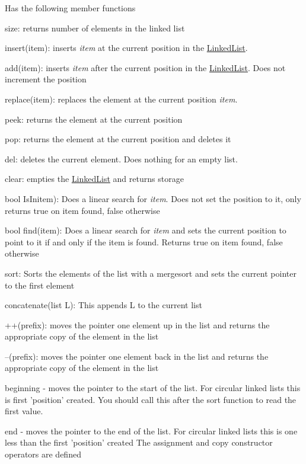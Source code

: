 Has the following member functions
\begin{DoxyItemize}
\item size\-: returns number of elements in the linked list
\item insert(item)\-: inserts {\itshape item} at the current position in the \hyperlink{class_data_structures_1_1_linked_list}{Linked\-List}.
\item add(item)\-: inserts {\itshape item} after the current position in the \hyperlink{class_data_structures_1_1_linked_list}{Linked\-List}. Does not increment the position
\item replace(item)\-: replaces the element at the current position {\itshape item}.
\item peek\-: returns the element at the current position
\item pop\-: returns the element at the current position and deletes it
\item del\-: deletes the current element. Does nothing for an empty list.
\item clear\-: empties the \hyperlink{class_data_structures_1_1_linked_list}{Linked\-List} and returns storage
\item bool Is\-Initem)\-: Does a linear search for {\itshape item}. Does not set the position to it, only returns true on item found, false otherwise
\item bool find(item)\-: Does a linear search for {\itshape item} and sets the current position to point to it if and only if the item is found. Returns true on item found, false otherwise
\item sort\-: Sorts the elements of the list with a mergesort and sets the current pointer to the first element
\item concatenate(list L)\-: This appends L to the current list
\item ++(prefix)\-: moves the pointer one element up in the list and returns the appropriate copy of the element in the list
\item --(prefix)\-: moves the pointer one element back in the list and returns the appropriate copy of the element in the list
\item beginning -\/ moves the pointer to the start of the list. For circular linked lists this is first 'position' created. You should call this after the sort function to read the first value.
\item end -\/ moves the pointer to the end of the list. For circular linked lists this is one less than the first 'position' created The assignment and copy constructor operators are defined
\end{DoxyItemize}

